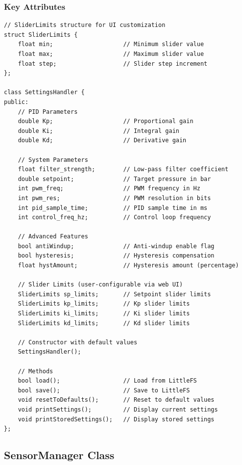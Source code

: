 \documentclass[12pt,a4paper]{article}
\begin{document}
\subsubsection{Key Attributes}
\begin{lstlisting}[caption=SettingsHandler Class Key Members - Actual Implementation]
// SliderLimits structure for UI customization
struct SliderLimits {
    float min;                    // Minimum slider value
    float max;                    // Maximum slider value
    float step;                   // Slider step increment
};

class SettingsHandler {
public:
    // PID Parameters
    double Kp;                    // Proportional gain
    double Ki;                    // Integral gain  
    double Kd;                    // Derivative gain
    
    // System Parameters
    float filter_strength;        // Low-pass filter coefficient
    double setpoint;              // Target pressure in bar
    int pwm_freq;                 // PWM frequency in Hz
    int pwm_res;                  // PWM resolution in bits
    int pid_sample_time;          // PID sample time in ms
    int control_freq_hz;          // Control loop frequency
    
    // Advanced Features
    bool antiWindup;              // Anti-windup enable flag
    bool hysteresis;              // Hysteresis compensation
    float hystAmount;             // Hysteresis amount (percentage)
    
    // Slider Limits (user-configurable via web UI)
    SliderLimits sp_limits;       // Setpoint slider limits
    SliderLimits kp_limits;       // Kp slider limits
    SliderLimits ki_limits;       // Ki slider limits
    SliderLimits kd_limits;       // Kd slider limits
    
    // Constructor with default values
    SettingsHandler();
    
    // Methods
    bool load();                  // Load from LittleFS
    bool save();                  // Save to LittleFS
    void resetToDefaults();       // Reset to default values
    void printSettings();         // Display current settings
    void printStoredSettings();   // Display stored settings
};
\end{lstlisting}

\subsection{SensorManager Class}
\end{document}
